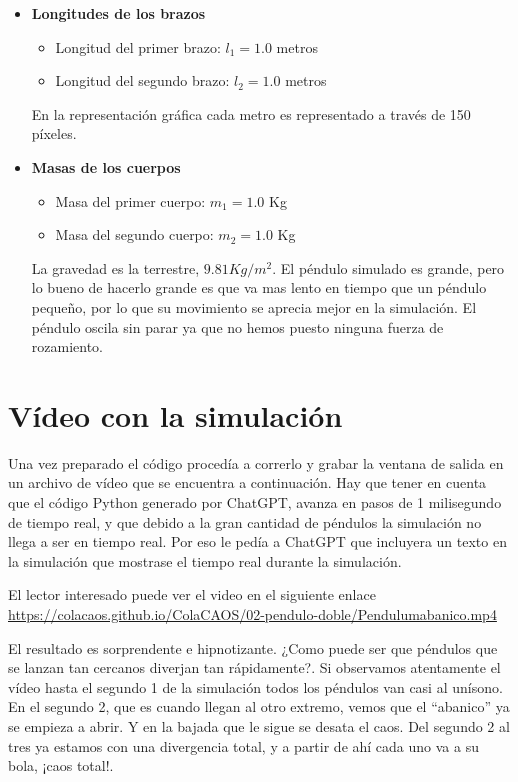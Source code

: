 \documentclass[
  10pt,
  a4paper,
  DIV=11,
  numbers=noendperiod,
  open=any]{scrreprt}
\providecommand{\tightlist}{%
  \setlength{\itemsep}{0pt}\setlength{\parskip}{0pt}}
\numberwithin{equation}{chapter}
\numberwithin{equation}{section}
\renewcommand{\[}{\begin{equation}}
\renewcommand{\]}{\end{equation}}
\begin{document}
\begin{itemize}
\item
  \textbf{Longitudes de los brazos}

  \begin{itemize}
  \tightlist
  \item
    Longitud del primer brazo: \(l_1 = 1.0\) metros\\
  \item
    Longitud del segundo brazo: \(l_2 = 1.0\) metros
  \end{itemize}

  En la representación gráfica cada metro es representado a través de
  150 píxeles.
\item
  \textbf{Masas de los cuerpos}

  \begin{itemize}
  \tightlist
  \item
    Masa del primer cuerpo: \(m_1 = 1.0\) Kg
  \item
    Masa del segundo cuerpo: \(m_2 = 1.0\) Kg
  \end{itemize}

  La gravedad es la terrestre, \(9.81 Kg/m^2\). El péndulo simulado es
  grande, pero lo bueno de hacerlo grande es que va mas lento en tiempo
  que un péndulo pequeño, por lo que su movimiento se aprecia mejor en
  la simulación. El péndulo oscila sin parar ya que no hemos puesto
  ninguna fuerza de rozamiento.
\end{itemize}

\section{Vídeo con la simulación}\label{sec-abanico}

Una vez preparado el código procedía a correrlo y grabar la ventana de
salida en un archivo de vídeo que se encuentra a continuación. Hay que
tener en cuenta que el código Python generado por ChatGPT, avanza en
pasos de 1 milisegundo de tiempo real, y que debido a la gran cantidad
de péndulos la simulación no llega a ser en tiempo real. Por eso le
pedía a ChatGPT que incluyera un texto en la simulación que mostrase el
tiempo real durante la simulación.

El lector interesado puede ver el video en el siguiente enlace \url{https://colacaos.github.io/ColaCAOS/02-pendulo-doble/Pendulumabanico.mp4}

El resultado es sorprendente e hipnotizante. ¿Como puede ser que
péndulos que se lanzan tan cercanos diverjan tan rápidamente?. Si
observamos atentamente el vídeo hasta el segundo 1 de la simulación
todos los péndulos van casi al unísono. En el segundo 2, que es cuando
llegan al otro extremo, vemos que el ``abanico'' ya se empieza a abrir.
Y en la bajada que le sigue se desata el caos. Del segundo 2 al tres ya
estamos con una divergencia total, y a partir de ahí cada uno va a su
bola, ¡caos total!.
\end{document}
